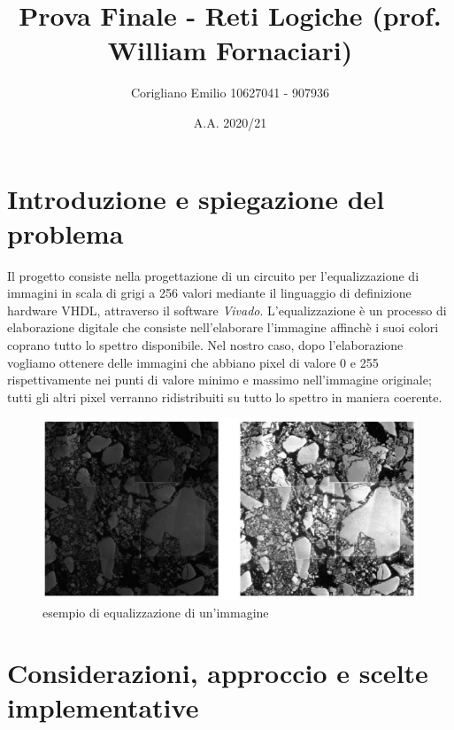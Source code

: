 \documentclass[11pt]{article} %
\title{Prova Finale - Reti Logiche (prof. William Fornaciari)}
\author{Corigliano Emilio 10627041 - 907936}
\date{A.A. 2020/21} %
\begin{document}
\maketitle

\section{Introduzione e spiegazione del problema}
Il progetto consiste nella progettazione di un circuito per l'equalizzazione di immagini in scala di grigi a 256 valori mediante il linguaggio di definizione hardware VHDL, attraverso il software \textit{Vivado}. L'equalizzazione è un processo di elaborazione digitale che consiste nell'elaborare l'immagine affinchè i suoi colori coprano tutto lo spettro disponibile. Nel nostro caso, dopo l'elaborazione vogliamo ottenere delle immagini che abbiano pixel di valore 0 e 255 rispettivamente nei punti di valore minimo e massimo nell'immagine originale; tutti gli altri pixel verranno ridistribuiti su tutto lo spettro in maniera coerente.

\begin{figure}[h!]
\centering
\includegraphics[width=120mm]{esempio-di-equalizzazione.png}
\caption{esempio di equalizzazione di un'immagine}
\end{figure}

\section{Considerazioni, approccio e scelte implementative}
\end{document}
